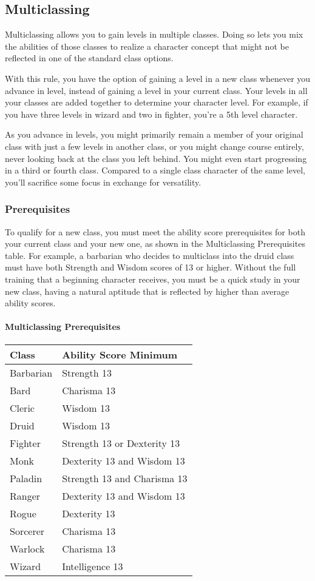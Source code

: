 \documentclass[
]{article}
\begin{document}
\hypertarget{multiclassing}{%
\subsection{Multiclassing}\label{multiclassing}}

Multiclassing allows you to gain levels in multiple classes. Doing so
lets you mix the abilities of those classes to realize a character
concept that might not be reflected in one of the standard class
options.

With this rule, you have the option of gaining a level in a new class
whenever you advance in level, instead of gaining a level in your
current class. Your levels in all your classes are added together to
determine your character level. For example, if you have three levels in
wizard and two in fighter, you're a 5th level character.

As you advance in levels, you might primarily remain a member of your
original class with just a few levels in another class, or you might
change course entirely, never looking back at the class you left behind.
You might even start progressing in a third or fourth class. Compared to
a single class character of the same level, you'll sacrifice some focus
in exchange for versatility.

\hypertarget{prerequisites}{%
\subsubsection{Prerequisites}\label{prerequisites}}

To qualify for a new class, you must meet the ability score
prerequisites for both your current class and your new one, as shown in
the Multiclassing Prerequisites table. For example, a barbarian who
decides to multiclass into the druid class must have both Strength and
Wisdom scores of 13 or higher. Without the full training that a
beginning character receives, you must be a quick study in your new
class, having a natural aptitude that is reflected by higher than
average ability scores.

\hypertarget{multiclassing-prerequisites}{%
\paragraph{Multiclassing
Prerequisites}\label{multiclassing-prerequisites}}

\begin{longtable}[]{@{}ll@{}}
\toprule
Class & Ability Score Minimum\tabularnewline
\midrule
\endhead
Barbarian & Strength 13\tabularnewline
Bard & Charisma 13\tabularnewline
Cleric & Wisdom 13\tabularnewline
Druid & Wisdom 13\tabularnewline
Fighter & Strength 13 or Dexterity 13\tabularnewline
Monk & Dexterity 13 and Wisdom 13\tabularnewline
Paladin & Strength 13 and Charisma 13\tabularnewline
Ranger & Dexterity 13 and Wisdom 13\tabularnewline
Rogue & Dexterity 13\tabularnewline
Sorcerer & Charisma 13\tabularnewline
Warlock & Charisma 13\tabularnewline
Wizard & Intelligence 13\tabularnewline
\bottomrule
\end{longtable}
\end{document}
